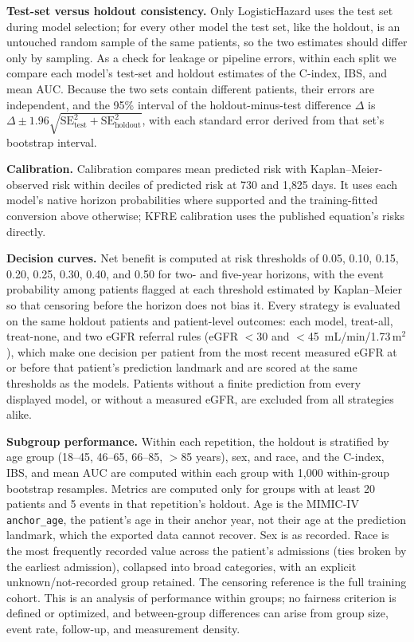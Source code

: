 \textbf{Test-set versus holdout consistency.} Only LogisticHazard uses the test set during model selection; for every other model the test set, like the holdout, is an untouched random sample of the same patients, so the two estimates should differ only by sampling. As a check for leakage or pipeline errors, within each split we compare each model's test-set and holdout estimates of the C-index, IBS, and mean AUC. Because the two sets contain different patients, their errors are independent, and the 95\% interval of the holdout-minus-test difference $\Delta$ is $\Delta \pm 1.96\sqrt{\mathrm{SE}_{\mathrm{test}}^2+\mathrm{SE}_{\mathrm{holdout}}^2}$, with each standard error derived from that set's bootstrap interval.

\textbf{Calibration.} Calibration compares mean predicted risk with Kaplan--Meier-observed risk within deciles of predicted risk at 730 and 1{,}825 days. It uses each model's native horizon probabilities where supported and the training-fitted conversion above otherwise; KFRE calibration uses the published equation's risks directly.

\textbf{Decision curves.} Net benefit \citep{vickers2006decisioncurve} is computed at risk thresholds of 0.05, 0.10, 0.15, 0.20, 0.25, 0.30, 0.40, and 0.50 for two- and five-year horizons, with the event probability among patients flagged at each threshold estimated by Kaplan--Meier so that censoring before the horizon does not bias it. Every strategy is evaluated on the same holdout patients and patient-level outcomes: each model, treat-all, treat-none, and two eGFR referral rules (eGFR $<$30 and $<$45~mL/min/1.73\,m$^2$), which make one decision per patient from the most recent measured eGFR at or before that patient's prediction landmark and are scored at the same thresholds as the models. Patients without a finite prediction from every displayed model, or without a measured eGFR, are excluded from all strategies alike.

\textbf{Subgroup performance.} Within each repetition, the holdout is stratified by age group (18--45, 46--65, 66--85, $>$85 years), sex, and race, and the C-index, IBS, and mean AUC are computed within each group with 1{,}000 within-group bootstrap resamples. Metrics are computed only for groups with at least 20 patients and 5 events in that repetition's holdout. Age is the MIMIC-IV \texttt{anchor\_age}, the patient's age in their anchor year, not their age at the prediction landmark, which the exported data cannot recover. Sex is as recorded. Race is the most frequently recorded value across the patient's admissions (ties broken by the earliest admission), collapsed into broad categories, with an explicit unknown/not-recorded group retained. The censoring reference is the full training cohort. This is an analysis of performance within groups; no fairness criterion is defined or optimized, and between-group differences can arise from group size, event rate, follow-up, and measurement density.

